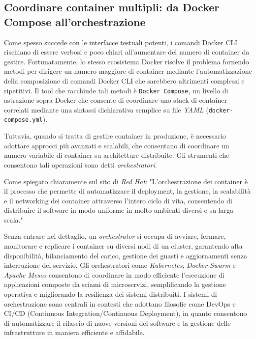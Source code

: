 \subsection{Coordinare container multipli: da Docker Compose all'orchestrazione}
Come spesso succede con le interfacce testuali potenti, i comandi Docker CLI rischiano di essere verbosi e poco chiari all'aumentare del numero di container da gestire. Fortunatamente, lo stesso ecosistema Docker risolve il problema fornendo metodi per dirigere un numero maggiore di container mediante l'automatizzazione della composizione di comandi Docker CLI che sarebbero altrimenti complessi e ripetitivi.
Il tool che racchiude tali metodi è \texttt{Docker Compose}, un livello di astrazione sopra Docker che consente di coordinare uno stack di container correlati mediante una sintassi dichiarativa semplice su file \emph{YAML} (\texttt{docker-compose.yml}).

Tuttavia, quando si tratta di gestire container in produzione, è necessario adottare approcci più avanzati e scalabili, che consentano di coordinare un numero variabile di container su architetture distribuite. Gli strumenti che consentono tali operazioni sono detti \emph{orchestratori}.

Come spiegato chiaramente sul sito di \emph{Red Hat}: "L'orchestrazione dei container è il processo che permette di automatizzare il deployment, la gestione, la scalabilità e il networking dei container attraverso l'intero ciclo di vita, consentendo di distribuire il software in modo uniforme in molto ambienti diversi e su larga scala." \cite{RedHat_Orchestration}

Senza entrare nel dettaglio, un \emph{orchestrator} si occupa di avviare, fermare, monitorare e replicare i container su diversi nodi di un cluster, garantendo alta disponibilità, bilanciamento del carico, gestione dei guasti e aggiornamenti senza interruzione del servizio. Gli orchestratori come \emph{Kubernetes}, \emph{Docker Swarm} e \emph{Apache Mesos} consentono di coordinare in modo efficiente l'esecuzione di applicazioni composte da sciami di microservizi, semplificando la gestione operativa e migliorando la resilienza dei sistemi distribuiti.
I sistemi di orchestrazione sono centrali in contesti che adottano filosofie come DevOps e CI/CD (Continuous Integration/Continuous Deployment), in quanto consentono di automatizzare il rilascio di nuove versioni del software e la gestione delle infrastrutture in maniera efficiente e affidabile.

